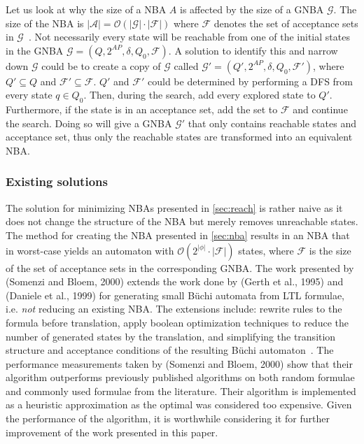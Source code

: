 Let us look at why the size of a NBA $A$ is affected by the size of a GNBA $\mathcal{G}$. The size of the NBA is $|\mathcal{A}| = \mathcal{O}(|\mathcal{G}| \cdot |\mathcal{F}|)$ where $\mathcal{F}$ denotes the set of acceptance sets in $\mathcal{G}$~\cite[thm. 4.56]{baier2008principles}. 
Not necessarily every state will be reachable from one of the initial states in the GNBA $\mathcal{G}=(Q,2^{AP},\delta,Q_0,\mathcal{F})$. A solution to identify this and narrow down $\mathcal{G}$ could be to create a copy of $\mathcal{G}$ called $\mathcal{G}'=(Q',2^{AP},\delta,Q_0,\mathcal{F}')$, where $Q' \subseteq Q$ and $\mathcal{F}' \subseteq \mathcal{F}$. $Q'$ and $\mathcal{F}'$ could be determined by performing a DFS from every state $q \in Q_0$. Then, during the search, add every explored state to $Q'$. Furthermore, if the state is in an acceptance set, add the set to $\mathcal{F}$ and continue the search. Doing so will give a GNBA $\mathcal{G}'$ that only contains reachable states and acceptance set, thus only the reachable states are transformed into an equivalent NBA.

\subsubsection{Existing solutions}\label{sec:existing}
The solution for minimizing NBAs presented in \autoref{sec:reach} is rather naive as it does not change the structure of the NBA but merely removes unreachable states. The method for creating the NBA presented in \autoref{sec:nba} results in an NBA that in worst-case yields an automaton with $\mathcal{O}(2^{|\phi|} \cdot |\mathcal{F}|)$ states, where $\mathcal{F}$ is the size of the set of acceptance sets in the corresponding GNBA. The work presented by (Somenzi and Bloem, 2000)\cite{somenzi2000efficient} extends the work done by (Gerth et al., 1995)\cite{gerth1995simple} and (Daniele et al., 1999)\cite{daniele1999improved} for generating small Büchi automata from LTL formulae, i.e. \emph{not} reducing an existing NBA. The extensions include: rewrite rules to the formula before translation, apply boolean optimization techniques to reduce the number of generated states by the translation, and simplifying the transition structure and acceptance conditions of the resulting Büchi automaton~\cite{somenzi2000efficient}. The performance measurements taken by (Somenzi and Bloem, 2000)\cite{somenzi2000efficient} show that their algorithm outperforms previously published algorithms on both random formulae and commonly used formulae from the literature. Their algorithm is implemented as a heuristic approximation as the optimal was considered too expensive. Given the performance of the algorithm, it is worthwhile considering it for further improvement of the work presented in this paper.

